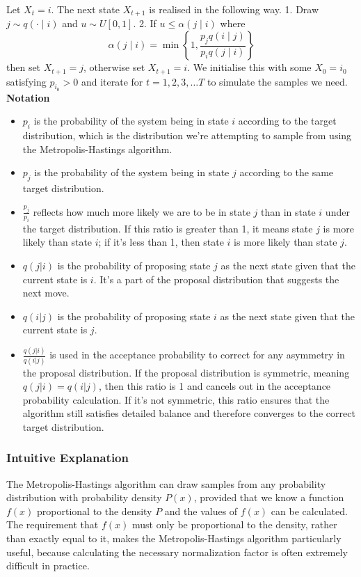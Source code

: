 \documentclass{article}
\begin{document}
Let $X_t=i$. The next state $X_{t+1}$ is realised in the following way.
1. Draw $j \sim q(\cdot \mid i)$ and $u \sim U[0,1]$.
2. If $u \leq \alpha(j \mid i)$ where
$$
\alpha(j \mid i)=\min \left\{1, \frac{p_j q(i \mid j)}{p_i q(j \mid i)}\right\}
$$
then set $X_{t+1}=j$, otherwise set $X_{t+1}=i$.
We initialise this with some $X_0=i_0$ satisfying $p_{i_0}>0$ and iterate for $t=1,2,3, \ldots T$ to simulate the samples we need. 
\newline
\textbf{Notation}
\begin{itemize}
    \item \( p_i \) is the probability of the system being in state \( i \) according to the target distribution, which is the distribution we're attempting to sample from using the Metropolis-Hastings algorithm.
    \item \( p_j \) is the probability of the system being in state \( j \) according to the same target distribution.
    \item  \( \frac{p_j}{p_i} \) reflects how much more likely we are to be in state \( j \) than in state \( i \) under the target distribution. If this ratio is greater than 1, it means state \( j \) is more likely than state \( i \); if it's less than 1, then state \( i \) is more likely than state \( j \).
\end{itemize}
\newline
\begin{itemize}
    \item \( q(j|i) \) is the probability of proposing state \( j \) as the next state given that the current state is \( i \). It's a part of the proposal distribution that suggests the next move.
    \item \( q(i|j) \) is the probability of proposing state \( i \) as the next state given that the current state is \( j \).
    \item  \( \frac{q(j|i)}{q(i|j)} \) is used in the acceptance probability to correct for any asymmetry in the proposal distribution. If the proposal distribution is symmetric, meaning \( q(j|i) = q(i|j) \), then this ratio is 1 and cancels out in the acceptance probability calculation. If it's not symmetric, this ratio ensures that the algorithm still satisfies detailed balance and therefore converges to the correct target distribution.
\end{itemize}
\newline
\subsubsection{Intuitive Explanation}
The Metropolis-Hastings algorithm can draw samples from any probability distribution with probability density $P(x)$, provided that we know a function $f(x)$ proportional to the density $P$ and the values of $f(x)$ can be calculated. The requirement that $f(x)$ must only be proportional to the density, rather than exactly equal to it, makes the Metropolis-Hastings algorithm particularly useful, because calculating the necessary normalization factor is often extremely difficult in practice.
\end{document}
